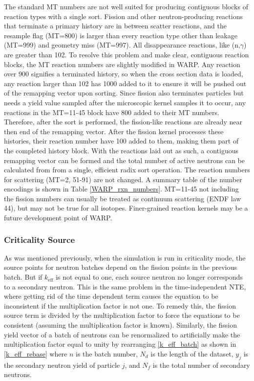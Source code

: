 The standard MT numbers are not well suited for producing contiguous blocks of reaction types with a single sort.  Fission and other neutron-producing reactions that terminate a primary history are in between scatter reactions, and the resample flag (MT=800) is larger than every reaction type other than leakage (MT=999) and geometry miss (MT=997).  All disappearance reactions, like (n,$\gamma$) are greater than 102.  To resolve this problem and make clear, contiguous reaction blocks, the MT reaction numbers are slightly modified in WARP.  Any reaction over 900 signifies a terminated history, so when the cross section data is loaded, any reaction larger than 102 has 1000 added to it to ensure it will be pushed out of the remapping vector upon sorting.  Since fission also terminates particles but needs a yield value sampled after the microscopic kernel samples it to occur, any reactions in the MT=11-45 block have 800 added to their MT numbers.  Therefore, after the sort is performed, the fission-like reactions are already near then end of the remapping vector.  After the fission kernel processes these histories, their reaction number have 100 added to them, making them part of the completed history block.  With the reactions laid out as such, a contiguous remapping vector can be formed and the total number of active neutrons can be calculated from from a single, efficient radix sort operation.  The reaction numbers for scattering (MT=2, 51-91) are not changed.  A summary table of the number encodings is shown in Table \ref{WARP_rxn_numbers}.  MT=11-45 not including the fission numbers can usually be treated as continuum scattering (ENDF law 44), but may not be true for all isotopes.  Finer-grained reaction kernels may be a future development point of WARP.  

\subsubsection{Criticality Source}

As was mentioned previously, when the simulation is run in criticality mode, the source points for neutron batches depend on the fission points in the previous batch.  But if $k_\mathrm{eff}$ is not equal to one, each source neutron no longer corresponds to a secondary neutron.  This is the same problem in the time-independent NTE, where getting rid of the time dependent term causes the equation to be inconsistent if the multiplication factor is not one.  To remedy this, the fission source term is divided by the multiplication factor to force the equations to be consistent (assuming the multiplication factor is known).  Similarly, the fission yield vector of a batch of neutrons can be renormalized to artificially make the multiplication factor equal to unity by rearranging \eqref{k_eff_batch} as shown in \eqref{k_eff_rebase} where $n$ is the batch number, $N_d$ is the length of the dataset, $y_j$ is the secondary neutron yield of particle $j$, and $N_f$ is the total number of secondary neutrons.

